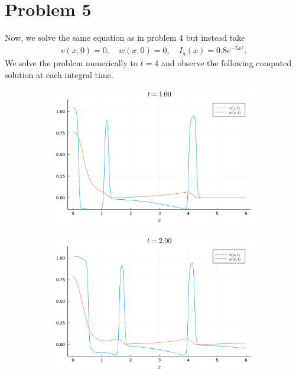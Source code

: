 \documentclass{article}
\begin{document}
\section{Problem 5}
Now, we solve the same equation as in problem 4 but instead take 
\begin{align*}
	v(x,0) = 0, \quad w(x,0) = 0, \quad I_a(x) = 0.8 e^{-5x^2}.
\end{align*}
We solve the problem numerically to $t=4$ and observe the following computed solution at each integral time. 
\begin{figure}[H]
	\centering
	\begin{subfigure}{0.495\linewidth}
		\centering
		\includegraphics[width=\linewidth]{prob5_t=1.pdf}
	\end{subfigure}
	\begin{subfigure}{0.495\linewidth}
		\centering
		\includegraphics[width=\linewidth]{prob5_t=2.pdf}

\end{subfigure}
\end{figure}
\end{document}
